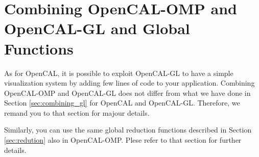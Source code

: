 \section{Combining OpenCAL-OMP and OpenCAL-GL and  Global Functions}

As for OpenCAL, it is possible to exploit OpenCAL-GL to have a simple
visualization system by adding few lines of code to your
application. Combining OpenCAL-OMP and OpenCAL-GL does not differ from
what we have done in Section \ref{sec:combining_gl} for OpenCAL and
OpenCAL-GL. Therefore, we remand you to that section for majour
details.

Similarly, you can use the same global reduction functions
described in Section \ref{sec:redution} also in OpenCAL-OMP.  Plese
refer to that section for further details.
